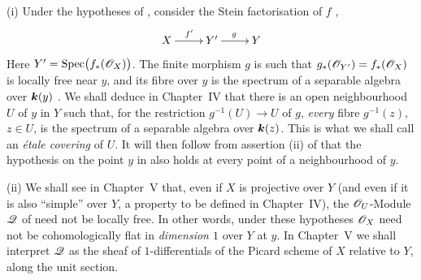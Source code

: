 \begin{remarks}[7.8.10]
\label{III.7.8.10}
\textnormal{(i)}
Under the hypotheses of , consider the
Stein factorisation of $f$ ,
\[
  \xymatrix{
    X \ar[r]^{f'} & Y' \ar[r]^{g} & Y
  }
\]
Here $Y'=\operatorname{Spec}\bigl(f_*(\mathscr{O}_X)\bigr)$.
The finite morphism $g$ is such that $g_*(\mathscr{O}_{Y'})=f_*(\mathscr{O}_X)$
is locally free near $y$, and its fibre over $y$ is the
spectrum of a separable algebra over $\boldsymbol{k}(y)$
.  We shall deduce in Chapter~IV that
there is an open neighbourhood $U$ of $y$ in $Y$ such that,
for the restriction $g^{-1}(U)\to U$ of $g$, \emph{every}
fibre $g^{-1}(z)$, $z\in U$, is the spectrum of a separable
algebra over $\boldsymbol{k}(z)$.  This is what we shall call an
\emph{\'etale covering} of $U$.  It will then follow from
assertion (ii) of  that the hypothesis on
the point $y$ in  also holds at every point
of a neighbourhood of $y$.

\medskip
\textnormal{(ii)}
We shall see in Chapter~V that, even if $X$ is projective
over $Y$ (and even if it is also ``simple'' over $Y$, a
property to be defined in Chapter~IV), the
$\mathscr{O}_U$-Module $\mathscr{Q}$ of  need not be
locally free.  In other words, under these hypotheses
$\mathscr{O}_X$ need not be cohomologically flat in
\emph{dimension $1$} over $Y$ at $y$.  In Chapter~V we
shall interpret $\mathscr{Q}$ as the sheaf of
$1$-differentials of the Picard scheme of $X$ relative to
$Y$, along the unit section.
\end{remarks}

